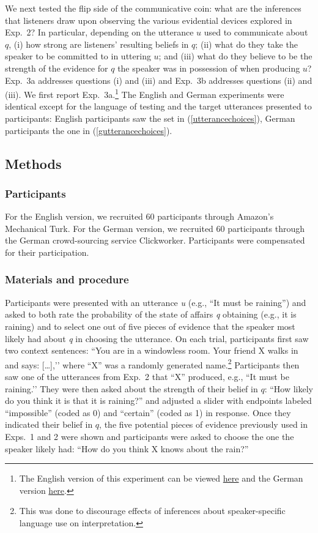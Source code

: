 \documentclass[11pt]{article}
\newcommand{\eref}[1]{(\ref{#1})}
\begin{document}
We next tested the flip side of the communicative coin: what are the inferences that listeners draw upon observing the various evidential devices explored in Exp.~2? In particular, depending on the utterance $u$ used to communicate about $q$, (i) how strong are listeners' resulting beliefs in $q$; (ii) what do they take the speaker to be committed to in uttering $u$; and (iii)  what do they believe to be the strength of the evidence for $q$ the speaker was in possession of when producing $u$? Exp.~3a addresses questions (i) and (iii) and Exp.~3b addresses questions (ii) and (iii). We first report Exp.~3a.\footnote{The English version of this experiment can be viewed \href{http://stanford.edu/~jdegen/72_modals_comprehension_evidence_room/modals.html}{here} and the German version \href{http://web.stanford.edu/~jdegen/cgi-bin/2_dp_comprehension_listenerbelief/modals.html}{here}.} The English and German experiments were identical except for the language of testing and the target utterances presented to participants: English participants saw the set in \eref{utterancechoices},  German participants the one in \eref{gutterancechoices}.

\subsection{Methods}

\subsubsection{Participants}

For the English version, we recruited 60 participants through Amazon's Mechanical Turk. 
For the German version, we recruited 60 participants through the German crowd-sourcing service Clickworker. Participants were compensated for their participation.

\subsubsection{Materials and procedure}

Participants were presented with an utterance \emph{u} (e.g., ``It must be raining'') and asked to both rate the probability of the state of affairs \emph{q} obtaining (e.g., it is raining) and to select one out of five pieces of evidence that the speaker most likely had about \emph{q} in choosing the utterance. On each trial, participants first saw two context sentences: ``You are in a windowless room. Your friend X walks in and says: […],’’ where ``X'' was a randomly generated name.\footnote{This was done to discourage effects of inferences about speaker-specific language use on interpretation.} Participants then saw one of the utterances from Exp.~2 that ``X'' produced, e.g., ``It must be raining.’’ They were then asked about the strength of their belief in $q$: ``How likely do you think it is that it is raining?'' and adjusted a slider with endpoints labeled ``impossible'' (coded as 0) and ``certain'' (coded as 1) in response. Once they indicated their belief in $q$, the five potential pieces of evidence previously used in Exps.~1 and 2 were shown and participants were asked to choose the one the speaker likely had: ``How do you think X knows about the rain?'' 
\end{document}
